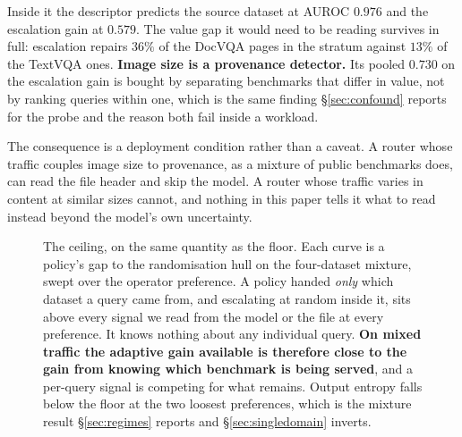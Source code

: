 \documentclass[10pt,twocolumn]{article}
\theoremstyle{plain}
\begin{document}
Inside it the descriptor predicts the source dataset at AUROC $0.976$ and the
escalation gain at $0.579$. The value gap it would need to be reading survives
in full: escalation repairs $36\%$ of the DocVQA pages in the stratum against
$13\%$ of the TextVQA ones. \textbf{Image size is a provenance detector.} Its
pooled $0.730$ on the escalation gain is bought by separating benchmarks that
differ in value, not by ranking queries within one, which is the same finding
\S\ref{sec:confound} reports for the probe and the reason both fail inside a
workload.

The consequence is a deployment condition rather than a caveat. A router whose
traffic couples image size to provenance, as a mixture of public benchmarks
does, can read the file header and skip the model. A router whose traffic
varies in content at similar sizes cannot, and nothing in this paper tells it
what to read instead beyond the model's own uncertainty.

\begin{figure}[t]
\centering
{}
\caption{The ceiling, on the same quantity as the floor. Each curve is a
policy's gap to the randomisation hull on the four-dataset mixture, swept over
the operator preference. A policy handed \emph{only} which dataset a query came
from, and escalating at random inside it, sits above every signal we read from
the model or the file at every preference. It knows nothing about any
individual query. \textbf{On mixed traffic the adaptive gain available is
therefore close to the gain from knowing which benchmark is being served}, and
a per-query signal is competing for what remains. Output entropy falls below
the floor at the two loosest preferences, which is the mixture result
\S\ref{sec:regimes} reports and \S\ref{sec:singledomain} inverts.}
\label{fig:ceiling}
\end{figure}
\end{document}
